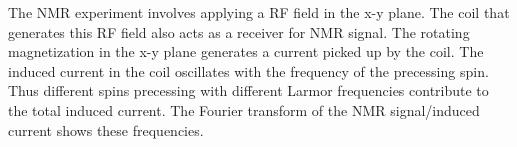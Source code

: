 \documentclass[aps,prb,onecolumn,notitlepage,showpacs,floatfix,superscriptaddress]{revtex4-1}
\begin{document}
The NMR experiment involves applying a RF field in the x-y plane. The coil that generates this RF field also acts as a receiver for NMR signal. The rotating magnetization in the x-y plane generates a current picked up by the coil. The induced current in the coil oscillates with the frequency of the precessing spin. Thus different spins precessing with different Larmor frequencies contribute to the total induced current. The Fourier transform of the NMR signal/induced current shows these frequencies.
\end{document}
